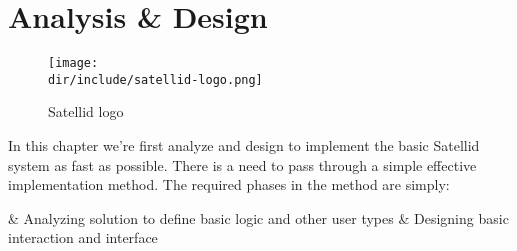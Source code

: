 \chapter{Analysis \& Design}
\label{chap:analysis-design}

\begin{figure}[ht]
    \centering
    \texttt{[image: \\dir/include/satellid-logo.png]}
    \caption{Satellid logo}
    \label{fig:satellid-logo}
\end{figure}

In this chapter we're first analyze and design to implement the basic Satellid system as fast as possible.
There is a need to pass through a simple effective implementation method.
The required phases in the method are simply:

\begin{easylist}
& Analyzing solution to define basic logic and other user types
& Designing basic interaction and interface
\end{easylist}

